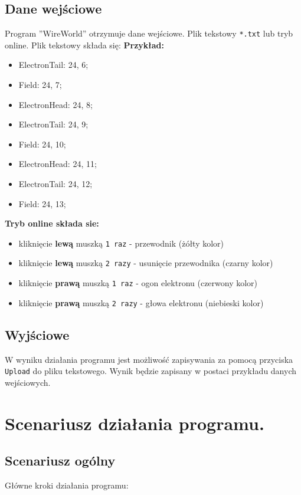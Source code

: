 \documentclass[a4paper, 12pt]{article}
\begin{document}
		\subsection{Dane wejściowe}
			\hspace*{1cm} Program ''WireWorld'' otrzymuje dane wejściowe. Plik tekstowy \texttt{*.txt} lub tryb online. Plik tekstowy składa się:\newline
			\textbf{Przykład:} 
			\begin{itemize}
			\item ElectronTail: 24, 6;
			\item Field: 24, 7;
			\item ElectronHead: 24, 8;
			\item ElectronTail: 24, 9;
			\item Field: 24, 10;
			\item ElectronHead: 24, 11;
			\item ElectronTail: 24, 12;
			\item Field: 24, 13;
			\end{itemize}
			
			\hspace*{1cm}\textbf{Tryb online składa sie:}
			
			\begin{itemize}
			\item kliknięcie \textbf{lewą} muszką \texttt{1 raz} - przewodnik (żółty kolor)  
			\item kliknięcie \textbf{lewą} muszką \texttt{2 razy} - usunięcie przewodnika (czarny kolor) 
			\item kliknięcie \textbf{prawą} muszką \texttt{1 raz} - ogon elektronu (czerwony kolor)
			\item kliknięcie \textbf{prawą} muszką \texttt{2 razy} - głowa elektronu (niebieski kolor)
			\end{itemize}
		
		\subsection{Wyjściowe}
			\hspace*{1cm}  W wyniku działania programu jest możliwość zapisywania za pomocą przyciska \texttt{Upload} do pliku tekstowego. Wynik będzie zapisany w postaci przykładu danych wejściowych.
\newpage
	\section{Scenariusz działania programu.}
		\subsection{Scenariusz ogólny}
			\hspace*{1cm} Główne kroki działania programu:
			
\end{document}
